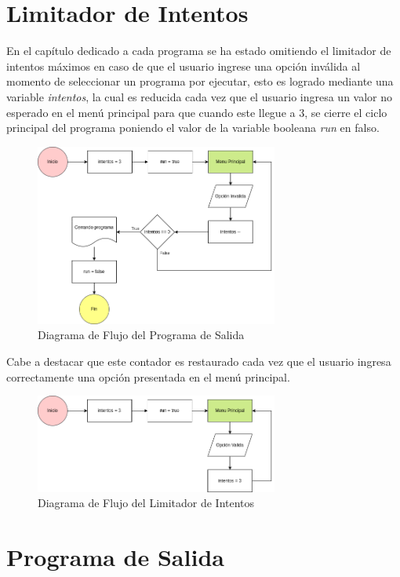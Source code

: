 \documentclass{article}
\begin{document}
\section{Limitador de Intentos}

En el capítulo dedicado a cada programa se ha estado omitiendo el limitador de intentos máximos en caso de que el usuario ingrese una opción inválida al momento de seleccionar un programa por ejecutar, esto es logrado mediante una variable \emph{intentos}, la cual es reducida cada vez que el usuario ingresa un valor no esperado en el menú principal para que cuando este llegue a 3, se cierre el ciclo principal del programa poniendo el valor de la variable booleana \emph{run} en falso.

\begin{figure}[H]
    \centering
    \includegraphics[width=8cm]{limitador_intentos_salida}
    \caption{Diagrama de Flujo del Programa de Salida}
\end{figure}

Cabe a destacar que este contador es restaurado cada vez que el usuario ingresa correctamente una opción presentada en el menú principal.

\begin{figure}[H]
    \centering
    \includegraphics[width=8cm]{limitador_intentos_reinicio}
    \caption{Diagrama de Flujo del Limitador de Intentos}
\end{figure}

\section{Programa de Salida}
\end{document}
